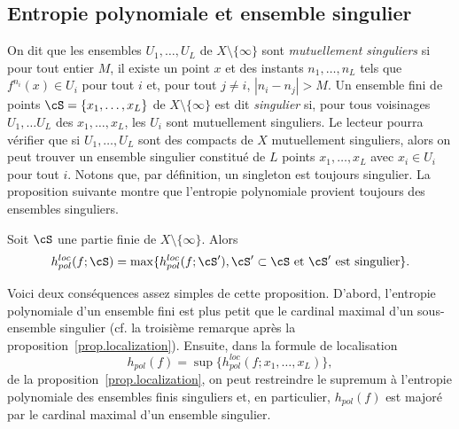 \subsection{Entropie polynomiale et ensemble singulier}\label{ss.singular-set}

On dit que les ensembles $U_{1}, \dots, U_{L}$ de $X \setminus \{\infty\}$ sont \emph{mutuellement singuliers} si pour tout entier $M$, il existe un point $x$ et des instants $n_{1}, \dots, n_{L}$ tels que $f^{n_{i}} (x) \in U_{i}$ pour tout $i$ et, pour tout $j \neq i$, $\left| n_{i}-n_{j} \right|> M$. Un ensemble fini de points $\cS = \{x_{1}, \dots, x_{L} \}$ de $X \setminus \{\infty\}$ est dit \emph{singulier} si, pour tous voisinages $U_{1}, \dots U_{L}$ des $x_1, \dots, x_L$, les $U_i$ sont mutuellement singuliers. Le lecteur pourra vérifier que si $U_{1}, \dots, U_{L}$ sont des compacts de $X$ mutuellement singuliers, alors on peut trouver {un ensemble singulier constitué de} $L$ points $x_{1}, \dots, x_{L}$ avec $x_{i} \in U_{i}$ pour tout $i$. Notons que, {par définition}, un {singleton} est toujours singulier. La proposition suivante montre que l'entropie polynomiale provient toujours des ensembles singuliers.

\begin{prop}\label{prop.singulier}
Soit $\cS$ {une partie finie} de $X \setminus \{\infty\}$. Alors
\[
h^{loc}_{pol}(f; \cS) =\max\{h^{loc}_{pol}(f; \cS'), \cS' \subset \cS \text{ et } \cS' \text{ est singulier}\}.
\]
\end{prop}

Voici deux conséquences assez simples de cette proposition. D'abord, l'entropie polynomiale d'un ensemble fini est plus petit que le cardinal maximal d'un sous-ensemble singulier (cf. la troisième remarque après la proposition~\ref{prop.localization}). Ensuite, dans la formule de localisation
\[
h_{pol}(f) = \sup\{h^{loc}_{pol}(f;x_{1}, \dots, x_{L})\},
\]
de la proposition~\ref{prop.localization}, on peut restreindre le supremum à l'entropie polynomiale des ensembles finis singuliers et, en particulier, $h_{pol}(f)$ est majoré par le cardinal maximal d'un ensemble singulier.


